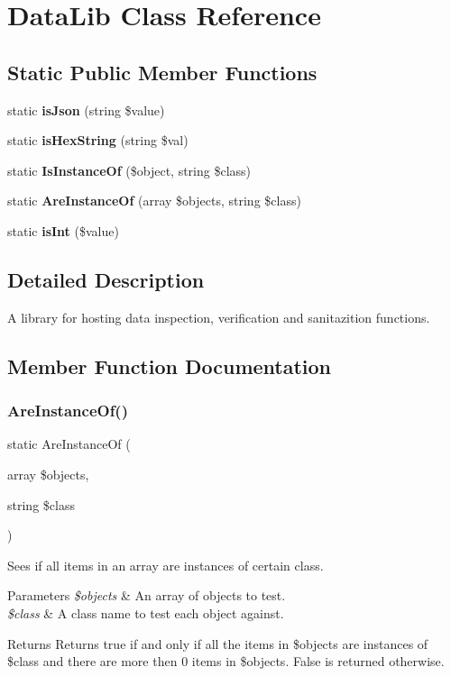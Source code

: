 \section{Data\+Lib Class Reference}
\label{class_data_lib}
\subsection*{Static Public Member Functions}
\begin{DoxyCompactItemize}
\item 
\mbox{\label{class_data_lib_a13d18479fbd2ba6266e58aff32f0937d}} 
static {\bfseries is\+Json} (string \$value)
\item 
\mbox{\label{class_data_lib_a8550f4875faca7b33f2aff29e6d5066a}} 
static {\bfseries is\+Hex\+String} (string \$val)
\item 
static \textbf{ Is\+Instance\+Of} (\$object, string \$class)
\item 
static \textbf{ Are\+Instance\+Of} (array \$objects, string \$class)
\item 
static \textbf{ is\+Int} (\$value)
\end{DoxyCompactItemize}


\subsection{Detailed Description}
A library for hosting data inspection, verification and sanitazition functions. 

\subsection{Member Function Documentation}
\mbox{\label{class_data_lib_a2bff9a99c41391c309a7618d522c8f16}} 
\subsubsection{Are\+Instance\+Of()}
{\footnotesize\ttfamily static Are\+Instance\+Of (\begin{DoxyParamCaption}\item[{array}]{\$objects,  }\item[{string}]{\$class }\end{DoxyParamCaption})\hspace{0.3cm}{\ttfamily [static]}}

Sees if all items in an array are instances of certain class. 
\begin{DoxyParams}{Parameters}
{\em \$objects} & An array of objects to test. \\
\hline
{\em \$class} & A class name to test each object against. \\
\hline
\end{DoxyParams}
\begin{DoxyReturn}{Returns}
Returns true if and only if all the items in \$objects are instances of \$class and there are more then 0 items in \$objects. False is returned otherwise. 
\end{DoxyReturn}

